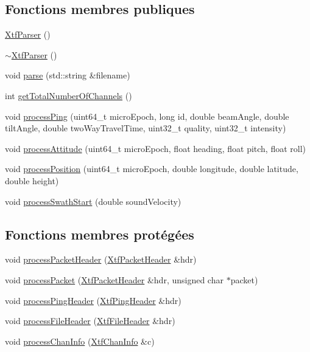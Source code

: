\subsection*{Fonctions membres publiques}
\begin{DoxyCompactItemize}
\item 
\hyperlink{classXtfParser_a7de4082b13254ad7db07a6b2d5ec1580}{Xtf\+Parser} ()
\item 
\hyperlink{classXtfParser_a97fd350f03421815e5371142da30d440}{$\sim$\+Xtf\+Parser} ()
\item 
void \hyperlink{classXtfParser_ab123eca9033ded892f7dab148257db12}{parse} (std\+::string \&filename)
\item 
int \hyperlink{classXtfParser_a9d9d875429479e3d837860365f120969}{get\+Total\+Number\+Of\+Channels} ()
\item 
void \hyperlink{classXtfParser_ae8932c52b4030f14acd8b4419037c3eb}{process\+Ping} (uint64\+\_\+t micro\+Epoch, long id, double beam\+Angle, double tilt\+Angle, double two\+Way\+Travel\+Time, uint32\+\_\+t quality, uint32\+\_\+t intensity)
\item 
void \hyperlink{classXtfParser_a0fd79d938b6556f028330bba8513a32f}{process\+Attitude} (uint64\+\_\+t micro\+Epoch, float heading, float pitch, float roll)
\item 
void \hyperlink{classXtfParser_abbb02ef84a6f01696fb1f6ed23d2bb5f}{process\+Position} (uint64\+\_\+t micro\+Epoch, double longitude, double latitude, double height)
\item 
void \hyperlink{classXtfParser_a27d3b28415cd8e7f52bbc94fa39d9533}{process\+Swath\+Start} (double sound\+Velocity)
\end{DoxyCompactItemize}
\subsection*{Fonctions membres protégées}
\begin{DoxyCompactItemize}
\item 
void \hyperlink{classXtfParser_a7115b43a3325220a4119f1f1c087a83b}{process\+Packet\+Header} (\hyperlink{structXtfPacketHeader}{Xtf\+Packet\+Header} \&hdr)
\item 
void \hyperlink{classXtfParser_a5fde05f1fd275c683f445f3cb9384757}{process\+Packet} (\hyperlink{structXtfPacketHeader}{Xtf\+Packet\+Header} \&hdr, unsigned char $\ast$packet)
\item 
void \hyperlink{classXtfParser_a933ceba950e674e638b7d60629883668}{process\+Ping\+Header} (\hyperlink{structXtfPingHeader}{Xtf\+Ping\+Header} \&hdr)
\item 
void \hyperlink{classXtfParser_ad8c238e6c7e5f6ede01abbd42cf252ac}{process\+File\+Header} (\hyperlink{structXtfFileHeader}{Xtf\+File\+Header} \&hdr)
\item 
void \hyperlink{classXtfParser_a56bb25e017d5139f837b3ca24d98085f}{process\+Chan\+Info} (\hyperlink{structXtfChanInfo}{Xtf\+Chan\+Info} \&c)
\end{DoxyCompactItemize}
